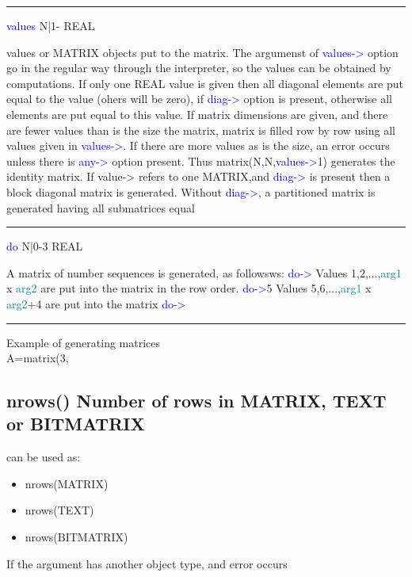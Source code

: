 \vspace{0.3cm}
\hrule
\vspace{0.3cm}
\noindent \textcolor{blue}{values} \tabto{3cm} N|1- \tabto{5cm}   REAL  \tabto{7cm}
\begin{changemargin}{3cm}{0cm}
\noindent values or MATRIX objects put to the matrix. The argumenst of
\textcolor{blue}{values->} option go in the regular way
through the interpreter, so the values can be obtained by computations. If only one REAL value is
given then all diagonal elements are put equal to the value (ohers will be zero),
if \textcolor{blue}{diag->} option is present, otherwise all elements are put equal to this value. If matrix dimensions
are given, and there are fewer values than is the size the matrix, matrix is
filled row by row using all values given in
\textcolor{blue}{values->}. If there are more values as is the size, an error occurs unless there is
\textcolor{blue}{any->} option present.
Thus \textcolor{VioletRed}{matrix}(N,N,\textcolor{blue}{values->}1) generates the identity matrix.
If value-> refers to one MATRIX,and \textcolor{blue}{diag->} is present then a block diagonal
matrix is generated. Without \textcolor{blue}{diag->}, a partitioned matrix is generated having all
submatrices equal
\end{changemargin}
\vspace{0.3cm}
\hrule
\vspace{0.3cm}
\noindent \textcolor{blue}{do}  \tabto{3cm} N|0-3 \tabto{5cm}  REAL   \tabto{7cm}
\begin{changemargin}{3cm}{0cm}
\noindent  A matrix of number sequences is generated, as followsws: \newline
\textcolor{blue}{do->} Values 1,2,...,\textcolor{teal}{arg1} x \textcolor{teal}{arg2} are put into the matrix in the row order. \newline
\textcolor{blue}{do->}5 Values 5,6,...,\textcolor{teal}{arg1} x \textcolor{teal}{arg2}+4 are put into the matrix \newline
\textcolor{blue}{do->}
\end {changemargin}
\hrule
\vspace{0.2cm}
\begin{example}[matrixex]Example of generating matrices\\
\label{matrixex}
A=\textcolor{VioletRed}{matrix}(3,

\end{example}

\subsection{\textcolor{VioletRed}{nrows}() Number of rows in MATRIX, TEXT or BITMATRIX}
\label{nrows}
can be used as:
\begin{itemize}
\item  \textcolor{VioletRed}{nrows}(MATRIX)
\item  \textcolor{VioletRed}{nrows}(TEXT)
\item  \textcolor{VioletRed}{nrows}(BITMATRIX)
\end{itemize}
\begin{note}
If the argument has another object type, and error occurs
\end{note}

